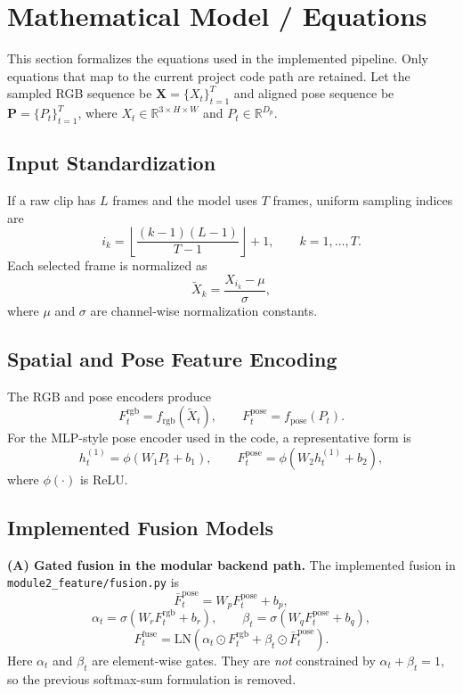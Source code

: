 \section{Mathematical Model / Equations}
This section formalizes the equations used in the implemented pipeline. Only equations that map to the current project code path are retained. Let the sampled RGB sequence be $\mathbf{X}=\{X_t\}_{t=1}^{T}$ and aligned pose sequence be $\mathbf{P}=\{P_t\}_{t=1}^{T}$, where $X_t\in\mathbb{R}^{3\times H\times W}$ and $P_t\in\mathbb{R}^{D_p}$.

\subsection{Input Standardization}
If a raw clip has $L$ frames and the model uses $T$ frames, uniform sampling indices are
\begin{equation}
i_k = \left\lfloor \frac{(k-1)(L-1)}{T-1} \right\rfloor + 1, \qquad k=1,\dots,T.
\end{equation}
Each selected frame is normalized as
\begin{equation}
\tilde{X}_k = \frac{X_{i_k}-\mu}{\sigma},
\end{equation}
where $\mu$ and $\sigma$ are channel-wise normalization constants.

\subsection{Spatial and Pose Feature Encoding}
The RGB and pose encoders produce
\begin{equation}
F_t^{\mathrm{rgb}} = f_{\mathrm{rgb}}(\tilde{X}_t),
\qquad
F_t^{\mathrm{pose}} = f_{\mathrm{pose}}(P_t).
\end{equation}
For the MLP-style pose encoder used in the code, a representative form is
\begin{equation}
h_t^{(1)} = \phi(W_1P_t + b_1),
\qquad
F_t^{\mathrm{pose}} = \phi(W_2h_t^{(1)} + b_2),
\end{equation}
where $\phi(\cdot)$ is ReLU.

\subsection{Implemented Fusion Models}
\textbf{(A) Gated fusion in the modular backend path.} The implemented fusion in \texttt{module2\_feature/fusion.py} is
\begin{equation}
\bar{F}_t^{\mathrm{pose}} = W_pF_t^{\mathrm{pose}} + b_p,
\end{equation}
\begin{equation}
\alpha_t = \sigma(W_rF_t^{\mathrm{rgb}} + b_r),
\qquad
\beta_t = \sigma(W_qF_t^{\mathrm{pose}} + b_q),
\end{equation}
\begin{equation}
F_t^{\mathrm{fuse}} = \mathrm{LN}\!\left(\alpha_t\odot F_t^{\mathrm{rgb}} + \beta_t\odot \bar{F}_t^{\mathrm{pose}}\right).
\end{equation}
Here $\alpha_t$ and $\beta_t$ are element-wise gates. They are \emph{not} constrained by $\alpha_t+\beta_t=1$, so the previous softmax-sum formulation is removed.


